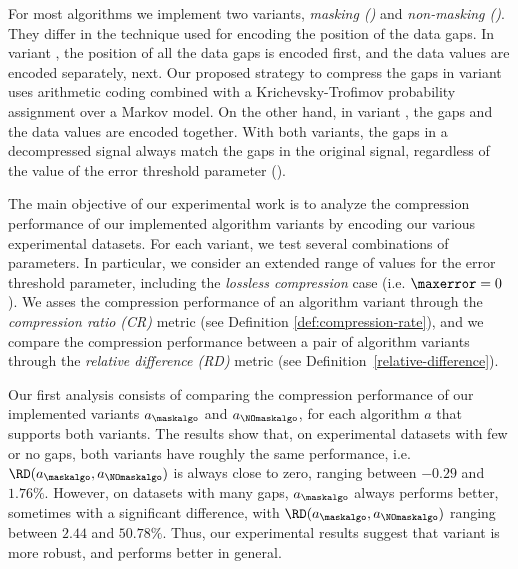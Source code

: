 For most algorithms we implement two variants, \textit{masking (\maskalgo)} and \textit{non-masking (\NOmaskalgo)}. They differ in the technique used for encoding the position of the data gaps. In variant \maskalgo, the position of all the data gaps is encoded first, and the data values are encoded separately, next. Our proposed strategy to compress the gaps in variant \maskalgo uses arithmetic coding \cite{ac2, Cover2005} combined with a Krichevsky-Trofimov probability assignment \cite{ktestimator} over a Markov model. On the other hand, in variant \NOmaskalgo, the gaps and the data values are encoded together. With both variants, the gaps in a decompressed signal always match the gaps in the original signal, regardless of the value of the error threshold parameter (\maxerror).


The main objective of our experimental work is to analyze the compression performance of our implemented algorithm variants by encoding our various experimental datasets. For each variant, we test several combinations of parameters. In particular, we consider an extended range of values for the error threshold parameter, including the \textit{lossless compression} case (i.e. $\maxerror=0$). We asses the compression performance of an algorithm variant through the \textit{compression ratio (CR)} metric (see Definition \ref{def:compression-rate}), and we compare the compression performance between a pair of algorithm variants through the \textit{relative difference (RD)} metric (see Definition~\ref{relative-difference}). 


Our first analysis consists of comparing the compression performance of our implemented variants $a_\maskalgo$ and $a_\NOmaskalgo$, for each algorithm $a$ that supports both variants. The results show that, on experimental datasets with few or no gaps, both variants have roughly the same performance, i.e. $\RD(a_\maskalgo, a_\NOmaskalgo)$ is always close to zero, ranging between $-0.29$ and $1.76\%$. However, on datasets with many gaps, $a_\maskalgo$ always performs better, sometimes with a significant difference, with $\RD(a_\maskalgo, a_\NOmaskalgo)$ ranging between $2.44$ and $50.78\%$. Thus, our experimental results suggest that variant \maskalgo is more robust, and performs better in general.


